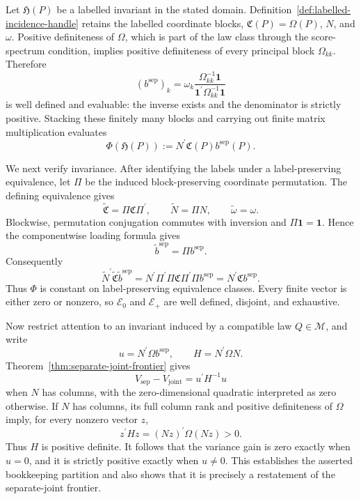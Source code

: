 Let \(\mathfrak H(P)\) be a labelled invariant in the stated domain. Definition~\ref{def:labelled-incidence-handle} retains the labelled coordinate blocks, \(\mathfrak C(P)=\Omega(P)\), \(N\), and \(\omega\). Positive definiteness of \(\Omega\), which is part of the law class through the score-spectrum condition, implies positive definiteness of every principal block \(\Omega_{kk}\). Therefore
\[
 (b^{\mathrm{sep}})_k
 =\omega_k\frac{\Omega_{kk}^{-1}\mathbf 1}
 {\mathbf 1^{\prime}\Omega_{kk}^{-1}\mathbf 1}
\]
is well defined and evaluable: the inverse exists and the denominator is strictly positive. Stacking these finitely many blocks and carrying out finite matrix multiplication evaluates
\[
 \Phi(\mathfrak H(P))
 :=N^{\prime}\mathfrak C(P)b^{\mathrm{sep}}(P).
\]

We next verify invariance. After identifying the labels under a label-preserving equivalence, let \(\Pi\) be the induced block-preserving coordinate permutation. The defining equivalence gives
\[
 \widetilde{\mathfrak C}=\Pi\mathfrak C\Pi^{\prime},
 \qquad
 \widetilde N=\Pi N,
 \qquad
 \widetilde\omega=\omega.
\]
Blockwise, permutation conjugation commutes with inversion and \(\Pi\mathbf 1=\mathbf 1\). Hence the componentwise loading formula gives
\[
 \widetilde b^{\mathrm{sep}}=\Pi b^{\mathrm{sep}}.
\]
Consequently
\[
 \widetilde N^{\prime}\widetilde{\mathfrak C}
 \widetilde b^{\mathrm{sep}}
 =N^{\prime}\Pi^{\prime}\Pi\mathfrak C\Pi^{\prime}\Pi
 b^{\mathrm{sep}}
 =N^{\prime}\mathfrak Cb^{\mathrm{sep}}.
\]
Thus \(\Phi\) is constant on label-preserving equivalence classes. Every finite vector is either zero or nonzero, so \(\mathscr E_0\) and \(\mathscr E_+\) are well defined, disjoint, and exhaustive.

Now restrict attention to an invariant induced by a compatible law \(Q\in\mathcal M\), and write
\[
 u=N^{\prime}\Omega b^{\mathrm{sep}},
 \qquad
 H=N^{\prime}\Omega N.
\]
Theorem~\ref{thm:separate-joint-frontier} gives
\[
 V_{\mathrm{sep}}-V_{\mathrm{joint}}=u^{\prime}H^{-1}u
\]
when \(N\) has columns, with the zero-dimensional quadratic interpreted as zero otherwise. If \(N\) has columns, its full column rank and positive definiteness of \(\Omega\) imply, for every nonzero vector \(z\),
\[
 z^{\prime}Hz=(Nz)^{\prime}\Omega(Nz)>0.
\]
Thus \(H\) is positive definite. It follows that the variance gain is zero exactly when \(u=0\), and it is strictly positive exactly when \(u\ne0\). This establishes the asserted bookkeeping partition and also shows that it is precisely a restatement of the separate-joint frontier.

